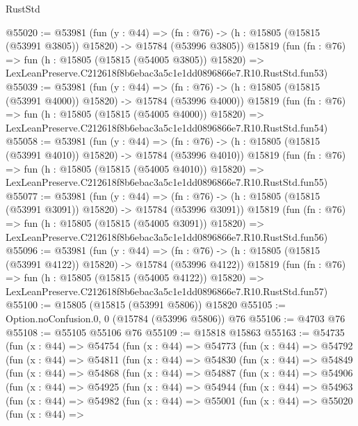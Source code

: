 \begin{lexlean}{RustStd}
\begin{coremodule}
@55020 := @53981
    (fun (y : @44) =>
    (fn : @76) -> (h : @15805 (@15815 (@53991 @3805)) @15820) -> @15784 (@53996 @3805))
    @15819
    (fun (fn : @76) =>
    fun (h : @15805 (@15815 (@54005 @3805)) @15820) =>
    LexLeanPreserve.C212618f8b6ebac3a5c1e1dd0896866e7.R10.RustStd.fun53)
@55039 := @53981
    (fun (y : @44) =>
    (fn : @76) -> (h : @15805 (@15815 (@53991 @4000)) @15820) -> @15784 (@53996 @4000))
    @15819
    (fun (fn : @76) =>
    fun (h : @15805 (@15815 (@54005 @4000)) @15820) =>
    LexLeanPreserve.C212618f8b6ebac3a5c1e1dd0896866e7.R10.RustStd.fun54)
@55058 := @53981
    (fun (y : @44) =>
    (fn : @76) -> (h : @15805 (@15815 (@53991 @4010)) @15820) -> @15784 (@53996 @4010))
    @15819
    (fun (fn : @76) =>
    fun (h : @15805 (@15815 (@54005 @4010)) @15820) =>
    LexLeanPreserve.C212618f8b6ebac3a5c1e1dd0896866e7.R10.RustStd.fun55)
@55077 := @53981
    (fun (y : @44) =>
    (fn : @76) -> (h : @15805 (@15815 (@53991 @3091)) @15820) -> @15784 (@53996 @3091))
    @15819
    (fun (fn : @76) =>
    fun (h : @15805 (@15815 (@54005 @3091)) @15820) =>
    LexLeanPreserve.C212618f8b6ebac3a5c1e1dd0896866e7.R10.RustStd.fun56)
@55096 := @53981
    (fun (y : @44) =>
    (fn : @76) -> (h : @15805 (@15815 (@53991 @4122)) @15820) -> @15784 (@53996 @4122))
    @15819
    (fun (fn : @76) =>
    fun (h : @15805 (@15815 (@54005 @4122)) @15820) =>
    LexLeanPreserve.C212618f8b6ebac3a5c1e1dd0896866e7.R10.RustStd.fun57)
@55100 := @15805 (@15815 (@53991 @5806)) @15820
@55105 := Option.noConfusion.{0, 0} (@15784 (@53996 @5806)) @76
@55106 := @4703 @76
@55108 := @55105 @55106 @76
@55109 := @15818 @15863
@55163 := @54735
    (fun (x : @44) =>
    @54754
      (fun (x : @44) =>
      @54773
        (fun (x : @44) =>
        @54792
          (fun (x : @44) =>
          @54811
            (fun (x : @44) =>
            @54830
              (fun (x : @44) =>
              @54849
                (fun (x : @44) =>
                @54868
                  (fun (x : @44) =>
                  @54887
                    (fun (x : @44) =>
                    @54906
                      (fun (x : @44) =>
                      @54925
                        (fun (x : @44) =>
                        @54944
                          (fun (x : @44) =>
                          @54963
                            (fun (x : @44) =>
                            @54982
                              (fun (x : @44) =>
                              @55001
                                (fun (x : @44) =>
                                @55020
                                  (fun (x : @44) =>

\end{coremodule}
\end{lexlean}
